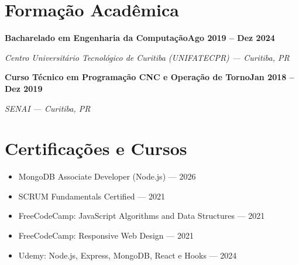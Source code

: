 \documentclass[11pt,a4paper]{article}
\newcommand{\entryheader}[2]{%
  \noindent\textbf{#1}\hfill\textbf{#2}\par
}
\newcommand{\entrysub}[1]{%
  \noindent\textit{\color{graytext}#1}\par\vspace{2pt}
}
\begin{document}
\section{Forma\c{c}\~ao Acad\^emica}

\entryheader{Bacharelado em Engenharia da Computa\c{c}\~ao}{Ago 2019 -- Dez 2024}
\entrysub{Centro Universit\'ario Tecnol\'ogico de Curitiba (UNIFATECPR) --- Curitiba, PR}

\entryheader{Curso T\'ecnico em Programa\c{c}\~ao CNC e Opera\c{c}\~ao de Torno}{Jan 2018 -- Dez 2019}
\entrysub{SENAI --- Curitiba, PR}

\section{Certifica\c{c}\~oes e Cursos}
\begin{itemize}
  \item MongoDB Associate Developer (Node.js) --- 2026
  \item SCRUM Fundamentals Certified --- 2021
  \item FreeCodeCamp: JavaScript Algorithms and Data Structures --- 2021
  \item FreeCodeCamp: Responsive Web Design --- 2021
  \item Udemy: Node.js, Express, MongoDB, React e Hooks --- 2024
\end{itemize}
\end{document}
